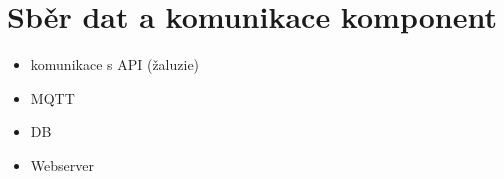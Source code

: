 \chapter{Sběr dat a komunikace komponent} \label{chap:dataCollection}
\begin{itemize}
  \item komunikace s API (žaluzie)
  \item MQTT
  \item DB
  \item Webserver  
\end{itemize}
